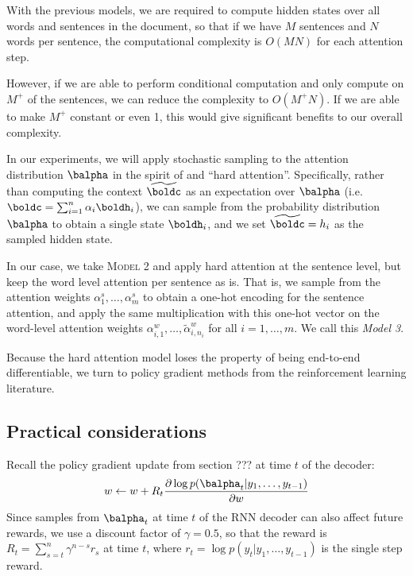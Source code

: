 \documentclass[11pt]{report}
\begin{document}
With the previous models, we are required to compute hidden states over all words and sentences in the document, so that if we have $M$ sentences and $N$ words per sentence, the computational complexity is $O(MN)$ for each attention step.

However, if we are able to perform conditional computation and only compute on $M^+$ of the sentences, we can reduce the complexity to $O(M^+N)$. If we are able to make $M^+$ constant or even 1, this would give significant benefits to our overall complexity.

In our experiments, we will apply stochastic sampling to the attention distribution $\balpha$ in the spirit of \citet{xu2015captioning} and ``hard attention''.
Specifically, rather than computing the context $\widetilde{\boldc}$ as an expectation over $\balpha$ (i.e. $\boldc = \sum_{i=1}^n \alpha_i \boldh_i$), we can sample from the probability distribution $\balpha$ to obtain a single state $\boldh_i$, and we set $\widetilde{\boldc} = h_i$ as the sampled hidden state.

In our case, we take \textsc{Model 2} and apply hard attention at the sentence level, but keep the word level attention per sentence as is. That is, we sample from the attention weights $\alpha_1^s, \ldots, \alpha_m^s$ to obtain a one-hot encoding for the sentence attention, and apply the same multiplication with this one-hot vector on the word-level attention weights $\alpha_{i,1}^w, \ldots, \widetilde{\alpha}_{i,n_i}^w$ for all $i = 1, \ldots, m$. We call this \emph{Model 3}.


Because the hard attention model loses the property of being end-to-end differentiable, we turn to policy gradient methods from the reinforcement learning literature. %


\subsection{Practical considerations}

Recall the policy gradient update from section ??? at time $t$ of the decoder:
\begin{equation}
w \gets w + R_t \frac{\partial \log p(\balpha_t | y_1, \ldots, y_{t-1})}{\partial w}
\end{equation}
Since samples from $\balpha_t$ at time $t$ of the RNN decoder can also affect future rewards, we use a discount factor of $\gamma = 0.5$, so that the reward is $R_t = \sum_{s = t}^n \gamma^{n-s}r_s$ at time $t$, where $r_t = \log p(y_t | y_1, \ldots, y_{t-1})$ is the single step reward.
\end{document}
